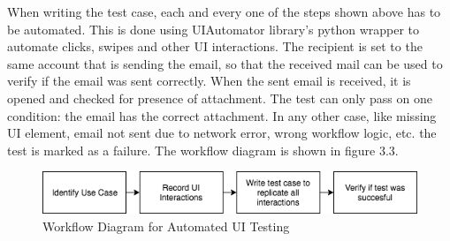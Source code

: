 When writing the test case, each and every one of the steps shown above has to be automated. This is done using UIAutomator library's python wrapper\cite{uiautomatordoc} to automate clicks, swipes and other UI interactions. The recipient is set to the same account that is sending the email, so that the received mail can be used to verify if the email was sent correctly. When the sent email is received, it is opened and checked for presence of attachment. The test can only pass on one condition: the email has the correct attachment. In any other case, like missing UI element, email not sent due to network error, wrong workflow logic, etc. the test is marked as a failure. The workflow diagram is shown in figure 3.3.

\vspace{0.5cm}
\begin{figure}[!h]
 	\begin{center}
		\includegraphics[scale=0.7]{Workflow2}
		\caption{Workflow Diagram for Automated UI Testing}
	\end{center}
\end{figure}